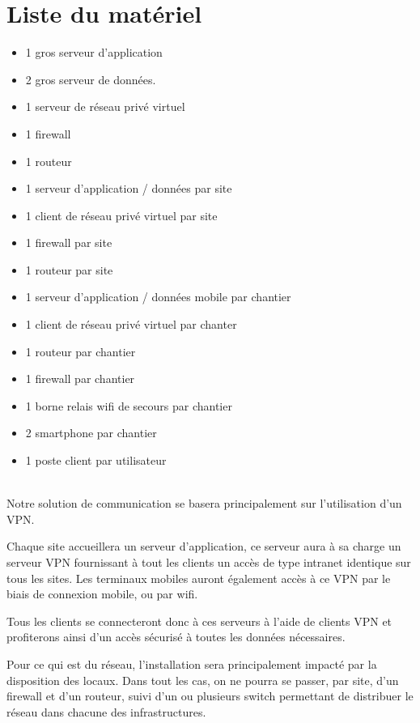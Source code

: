 \section{Liste du matériel}
\begin{itemize}
	\item 1 gros serveur d'application
	\item 2 gros serveur de données.
	\item 1 serveur de réseau privé virtuel
    \item 1 firewall
	\item 1 routeur\\

	\item 1 serveur d'application / données par site
	\item 1 client de réseau privé virtuel par site
    \item 1 firewall par site
	\item 1 routeur par site\\

	\item 1 serveur d'application / données mobile par chantier
	\item 1 client de réseau privé virtuel par chanter
	\item 1 routeur par chantier
    \item 1 firewall par chantier
	\item 1 borne relais wifi de secours par chantier
	\item 2 smartphone par chantier\\

	\item 1 poste client par utilisateur
\end{itemize}
~\\
    Notre solution de communication se basera principalement sur l'utilisation d'un VPN.

    Chaque site accueillera un serveur d'application, ce serveur aura à sa charge un serveur VPN fournissant à tout les clients un accès de type intranet identique sur tous les sites.
    Les terminaux mobiles auront également accès à ce VPN par le biais de connexion mobile, ou par wifi.

    Tous les clients se connecteront donc à ces serveurs à l'aide de clients VPN et profiterons ainsi d'un accès sécurisé à toutes les données nécessaires.

    Pour ce qui est du réseau, l'installation sera principalement impacté par la disposition des locaux.
    Dans tout les cas, on ne pourra se passer, par site, d'un firewall et d'un routeur, suivi d'un ou plusieurs switch permettant de distribuer le réseau dans chacune des infrastructures.

